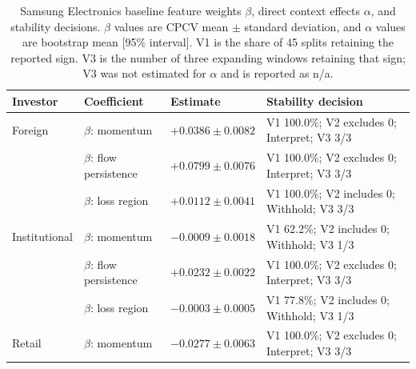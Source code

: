 
\begin{table}[t]
  \caption{Samsung Electronics baseline feature weights $\beta$, direct
  context effects $\alpha$, and stability decisions. $\beta$ values are
  CPCV mean $\pm$ standard deviation, and $\alpha$ values are bootstrap
  mean [95\% interval]. V1 is the share of 45 splits retaining the
  reported sign. V3 is the number of three expanding windows retaining
  that sign; V3 was not estimated for $\alpha$ and is reported as n/a.}
  \label{tab:reward-weights}
  \centering
  \scriptsize
  \setlength{\tabcolsep}{2pt}
  \begin{tabular}{@{}p{}p{}p{}p{}@{}}
    \toprule
    Investor & Coefficient & Estimate & Stability decision \\
    \midrule
    Foreign
      & $\beta$: momentum         & $+0.0386 \pm 0.0082$ & V1 100.0\%; V2 excludes 0; Interpret; V3 3/3 \\
      & $\beta$: flow persistence & $+0.0799 \pm 0.0076$ & V1 100.0\%; V2 excludes 0; Interpret; V3 3/3 \\
      & $\beta$: loss region      & $+0.0112 \pm 0.0041$ & V1 100.0\%; V2 includes 0; Withhold; V3 3/3 \\
    \addlinespace
    Institutional
      & $\beta$: momentum         & $-0.0009 \pm 0.0018$ & V1 62.2\%; V2 includes 0; Withhold; V3 1/3 \\
      & $\beta$: flow persistence & $+0.0232 \pm 0.0022$ & V1 100.0\%; V2 excludes 0; Interpret; V3 3/3 \\ %
      & $\beta$: loss region      & $-0.0003 \pm 0.0005$ & V1 77.8\%; V2 includes 0; Withhold; V3 1/3 \\
    \addlinespace
    Retail
      & $\beta$: momentum         & $-0.0277 \pm 0.0063$ & V1 100.0\%; V2 excludes 0; Interpret; V3 3/3 \\

\end{tabular}
\end{table}
